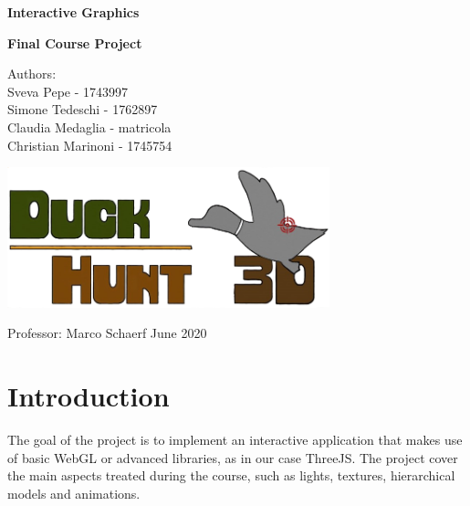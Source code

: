 \documentclass[12pt,a4paper]{article}
\begin{document}
	
\begin{titlepage}
	\begin{center}
		\vspace*{1cm}
		
		\LARGE
		\textbf{Interactive Graphics}
		
		\large 
		\textbf{Final Course Project}
		
		\vspace{1.5cm}
		Authors: \\
		Sveva Pepe - 1743997 \\ 
		Simone Tedeschi - 1762897 \\
		Claudia Medaglia - matricola \\
		Christian Marinoni - 1745754
		\vfill
		
		\includegraphics[width=0.7\textwidth]{logo}
	
		\vfill
		
		\large
		Professor: Marco Schaerf\break\break\break\break
		June 2020
		
	\end{center}
\end{titlepage}

\tableofcontents
\pagebreak
\section{Introduction}
The goal of the project is to implement an interactive application 
that makes use of basic WebGL or advanced libraries, as in our case ThreeJS. The project 
cover the main aspects treated during the course, such as lights, textures, hierarchical models and animations.
\end{document}
